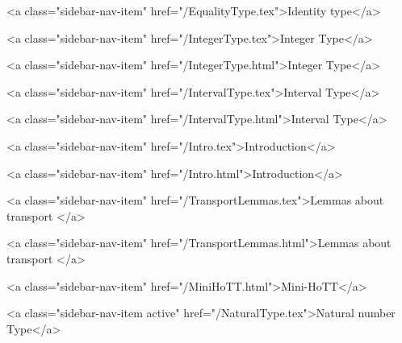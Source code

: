       
        
          <a class="sidebar-nav-item" href="/EqualityType.tex">Identity type</a>
        
      
    
      
        
          <a class="sidebar-nav-item" href="/IntegerType.tex">Integer Type</a>
        
      
    
      
        
          <a class="sidebar-nav-item" href="/IntegerType.html">Integer Type</a>
        
      
    
      
        
          <a class="sidebar-nav-item" href="/IntervalType.tex">Interval Type</a>
        
      
    
      
        
          <a class="sidebar-nav-item" href="/IntervalType.html">Interval Type</a>
        
      
    
      
        
          <a class="sidebar-nav-item" href="/Intro.tex">Introduction</a>
        
      
    
      
        
          <a class="sidebar-nav-item" href="/Intro.html">Introduction</a>
        
      
    
      
        
          <a class="sidebar-nav-item" href="/TransportLemmas.tex">Lemmas about transport </a>
        
      
    
      
        
          <a class="sidebar-nav-item" href="/TransportLemmas.html">Lemmas about transport </a>
        
      
    
      
        
          <a class="sidebar-nav-item" href="/MiniHoTT.html">Mini-HoTT</a>
        
      
    
      
        
          <a class="sidebar-nav-item active" href="/NaturalType.tex">Natural number Type</a>
        
      
    
